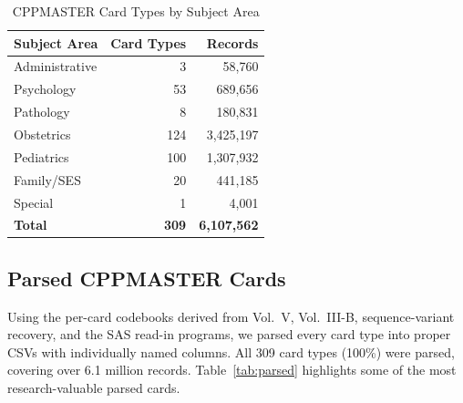 \documentclass[12pt]{article}
\begin{document}
\begin{table}[H]
\centering
\caption{CPPMASTER Card Types by Subject Area}
\label{tab:master}
\begin{tabular}{lrr}
\toprule
Subject Area & Card Types & Records \\
\midrule
Administrative & 3 & 58,760 \\
Psychology & 53 & 689,656 \\
Pathology & 8 & 180,831 \\
Obstetrics & 124 & 3,425,197 \\
Pediatrics & 100 & 1,307,932 \\
Family/SES & 20 & 441,185 \\
Special & 1 & 4,001 \\
\midrule
\textbf{Total} & \textbf{309} & \textbf{6,107,562} \\
\bottomrule
\end{tabular}
\end{table}

\subsection{Parsed CPPMASTER Cards}

Using the per-card codebooks derived from Vol.\ V, Vol.\ III-B, sequence-variant recovery, and the SAS read-in programs, we parsed every card type into proper CSVs with individually named columns. All 309 card types (100\%) were parsed, covering over 6.1 million records. Table~\ref{tab:parsed} highlights some of the most research-valuable parsed cards.
\end{document}
